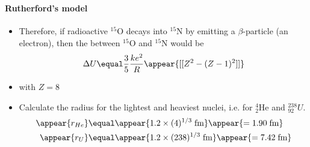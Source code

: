 \begin{frame}
\frametitle{\texorpdfstring{\culine[\sectiontitleulinecolor]{\sectiontitle}}{\sectiontitle} }
\framesubtitle{Rutherford's model}

\begin{itemize}
	\item Therefore, if radioactive ${ }^{15} \mathrm{O}$ decays into ${ }^{15} \mathrm{N}$ by emitting a $\beta$-particle (an electron), then the  between ${ }^{15} \mathrm{O}$ and ${ }^{15} \mathrm{N}$ would be
\[
\Delta U  \equal \frac{3}{5} \frac{k e^{2}}{R} \appear{\textrm{[[}Z^{2}-(Z-1)^{2} \textrm{]]}}
\]
\item[] with $Z=8$

\item {} Calculate the radius for the lightest and heaviest nuclei, i.e. for ${ }_{2}^{4} \mathrm{He}$ and ${ }^{238}_{92}U$. 
$$
\begin{aligned}
 \appear{r_{He}} & \equal \appear{1.2 \times (4)^{1/3} \mathrm{\;fm}}\appear{=1.90 \mathrm{\;fm}} \\
\appear{r_{U}} & \equal \appear{1.2 \times (238)^{1/3} \mathrm{\;fm}}\appear{=7.42 \mathrm{\;fm}}
\end{aligned}
$$
\end{itemize}


\endofslide 
\end{frame}

